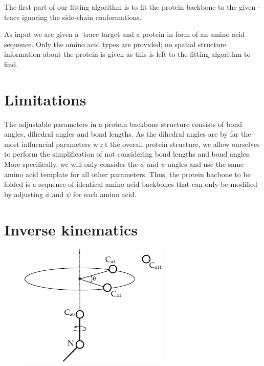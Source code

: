 The first part of our fitting algorithm is to fit the protein backbone to the given \Ca-trace ignoring the side-chain conformations.

As input we are given a \Ca-trace target and a protein in form of an amino acid sequence.
Only the amino acid types are provided; no spatial structure information about the protein is given as this is left to the fitting algorithm to find.

\section{Limitations}
The adjustable parameters in a protein backbone structure consists of bond angles, dihedral angles and bond lengths.
As the dihedral angles are by far the most influencial parameters w.r.t the overall protein structure, we allow ourselves to perform the simplification of not considering bond lengths and bond angles.
More specifically, we will only consider the $\phi$ and $\psi$ angles and use the same amino acid template for all other parameters.
Thus, the protein bacbone to be folded is a sequence of identical amino acid backbones that can only be modified by adjusting $\phi$ and $\psi$ for each amino acid.


\section{Inverse kinematics}


\begin{figure}
  \centering
	\includegraphics[width=0.75\columnwidth]{figures/ccd_angles}
	\label{fig:ccd_angles}
  \caption{}
\end{figure}

